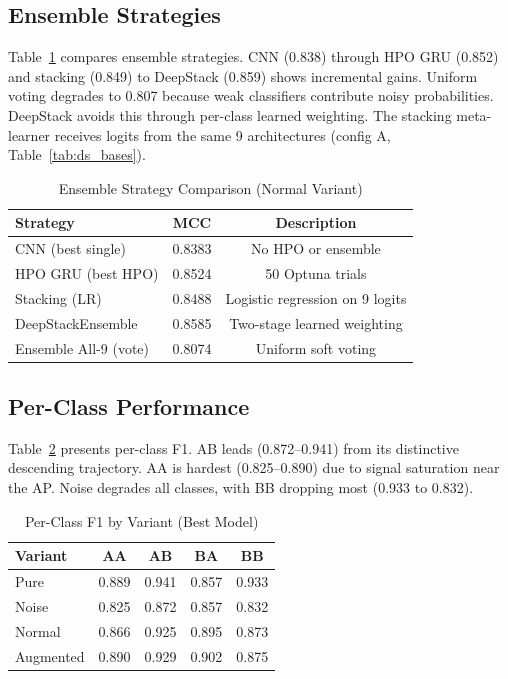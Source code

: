 \subsection{Ensemble Strategies}

Table~\ref{tab:ensembles} compares ensemble strategies. CNN (0.838) through HPO GRU (0.852) and stacking (0.849) to DeepStack (0.859) shows incremental gains. Uniform voting degrades to 0.807 because weak classifiers contribute noisy probabilities. DeepStack avoids this through per-class learned weighting. The stacking meta-learner receives logits from the same 9 architectures (config A, Table~\ref{tab:ds_bases}).

\begin{table}
    \centering
    \caption{Ensemble Strategy Comparison (Normal Variant)}
    \label{tab:ensembles}
    \begin{tabular}{lcc}\toprule
        Strategy              & MCC    & Description                     \\\midrule
        CNN (best single)     & 0.8383 & No HPO or ensemble              \\
        HPO GRU (best HPO)    & 0.8524 & 50 Optuna trials                \\
        Stacking (LR)         & 0.8488 & Logistic regression on 9 logits \\
        DeepStackEnsemble     & 0.8585 & Two-stage learned weighting     \\
        Ensemble All-9 (vote) & 0.8074 & Uniform soft voting             \\\bottomrule
    \end{tabular}
\end{table}


\subsection{Per-Class Performance}

Table~\ref{tab:per_class} presents per-class F1. AB leads (0.872--0.941) from its distinctive descending trajectory. AA is hardest (0.825--0.890) due to signal saturation near the AP. Noise degrades all classes, with BB dropping most (0.933 to 0.832).

\begin{table}
    \centering
    \caption{Per-Class F1 by Variant (Best Model)}
    \label{tab:per_class}
    \begin{tabular}{lcccc}\toprule
        Variant   & AA    & AB    & BA    & BB    \\\midrule
        Pure      & 0.889 & 0.941 & 0.857 & 0.933 \\
        Noise     & 0.825 & 0.872 & 0.857 & 0.832 \\
        Normal    & 0.866 & 0.925 & 0.895 & 0.873 \\
        Augmented & 0.890 & 0.929 & 0.902 & 0.875 \\\bottomrule
    \end{tabular}
\end{table}

